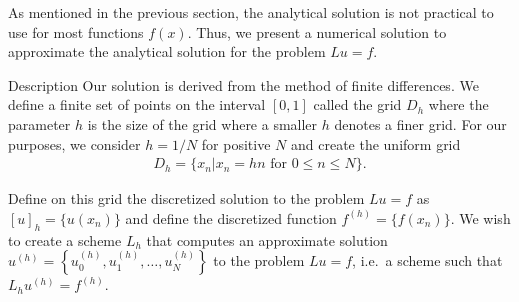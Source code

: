 As mentioned in the previous section, the analytical solution is not practical
to use for most functions $f(x)$. Thus, we present a numerical solution to
approximate the analytical solution for the problem $Lu = f$.

\begin{subsection}{Description}
  Our solution is derived from the method of finite differences. We define
  a finite set of points on the interval $[0, 1]$ called the grid $D_h$ where
  the parameter $h$ is the size of the grid where a smaller $h$ denotes a finer
  grid. For our purposes, we consider $h=1/N$ for positive $N$ and
  create the uniform grid
  \begin{align}\label{uniform_grid}
    D_h = \{x_n| x_n = hn \text{ for $0 \leq n \leq N$}\}.
  \end{align}

  Define on this grid the discretized solution to the problem $Lu = f$ as
  $[u]_h = \{u(x_n)\}$ and define the discretized function $f^{(h)} = \{f(x_n)\}$.
  We wish to create a scheme $L_h$ that computes an approximate solution
  $u^{(h)} = \left\{u_0^{(h)}, u_1^{(h)}, \dots, u_N^{(h)}\right\}$ to the problem
  $Lu = f$, i.e.\ a scheme such that $L_h u^{(h)} = f^{(h)}$.


\end{subsection}
